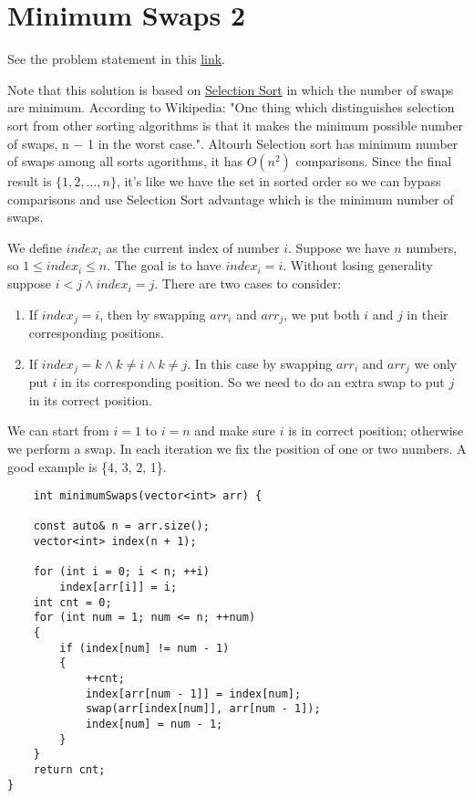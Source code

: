 \documentclass{book}
\begin{document}
	 \section{Minimum Swaps 2}
	 See the problem statement in this \href{https://www.hackerrank.com/challenges/minimum-swaps-2/problem?h_l=interview&playlist_slugs%5B%5D=interview-preparation-kit&playlist_slugs%5B%5D=arrays}{link}.
 	\par Note that this solution is based on \href{https://en.wikipedia.org/wiki/Selection_sort}{Selection Sort} in which the number of swaps are minimum. According to Wikipedia: "One thing which distinguishes selection sort from other sorting algorithms is that it makes the minimum possible number of swaps, n − 1 in the worst case.". Altourh Selection sort has minimum number of swaps among all sorts agorithms, it has $O(n^2)$ comparisons. Since the final result is $\{1, 2, \dots, n\}$, it's like we have the set in sorted order so we can bypass comparisons and use Selection Sort advantage which is the minimum number of swaps.
	 \par We define $index_i$ as the current index of number $i$. Suppose we have $n$ numbers, so $1 \le index_i \le n$. The goal is to have $index_i = i$. Without losing generality suppose $i < j \land index_i = j$. There are two cases to consider:
	 \begin{enumerate}
	 	\item If $index_j = i$, then by swapping $arr_i$ and $arr_j$, we put both $i$ and $j$ in their corresponding positions.
	 	\item If $index_j = k \land k \ne i \land k \ne j$. In this case by swapping $arr_i$ and $arr_j$ we only put $i$ in its corresponding position. So we need to do an extra swap to put $j$ in its correct position.
	 \end{enumerate}
 	We can start from $i = 1$ to $i = n$ and make sure $i$ is in correct position; otherwise we perform a swap. In each iteration we fix the position of one or two numbers. A good example is \{4, 3, 2, 1\}.
 	
 	\begin{lstlisting}
    int minimumSwaps(vector<int> arr) {

    const auto& n = arr.size();
    vector<int> index(n + 1);

    for (int i = 0; i < n; ++i)
        index[arr[i]] = i;
    int cnt = 0;
    for (int num = 1; num <= n; ++num)
    {
        if (index[num] != num - 1)
        {
            ++cnt;
            index[arr[num - 1]] = index[num];
            swap(arr[index[num]], arr[num - 1]);
            index[num] = num - 1;
        }
    }
    return cnt;
}
 	\end{lstlisting}
\end{document}
